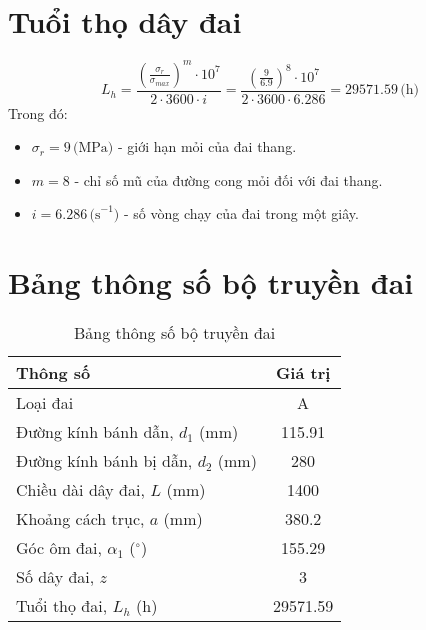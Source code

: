 \section{Tuổi thọ dây đai}
\begin{equation}
    L_h = \frac{\left(\frac{\sigma_r}{\sigma_{max}}\right)^m \cdot 10^7}{2 \cdot 3600 \cdot i} = \frac{\left(\frac{9}{6.9}\right)^8 \cdot 10^7}{2 \cdot 3600 \cdot 6.286} = 29571.59 \, \text{(h)}
\end{equation}
Trong đó:
\begin{itemize}
    \item $\sigma_r = 9 \, \text{(MPa)}$ - giới hạn mỏi của đai thang.
    \item $m = 8$ - chỉ số mũ của đường cong mỏi đối với đai thang.
    \item $i = 6.286 \, \text{(s}^{-1}\text{)}$ - số vòng chạy của đai trong một giây.
\end{itemize}
\section{Bảng thông số bộ truyền đai}
\begin{table}[H]
    \centering
    \begin{tabular}{|l|c|}
        \hline
        \textbf{Thông số} & \textbf{Giá trị} \\ \hline
        Loại đai & A \\ \hline
        Đường kính bánh dẫn, $d_1$ (mm) & 115.91 \\ \hline
        Đường kính bánh bị dẫn, $d_2$ (mm) & 280 \\ \hline
        Chiều dài dây đai, $L$ (mm) & 1400 \\ \hline
        Khoảng cách trục, $a$ (mm) & 380.2 \\ \hline
        Góc ôm đai, $\alpha_1$ ($^\circ$) & 155.29 \\ \hline
        Số dây đai, $z$ & 3 \\ \hline
        Tuổi thọ đai, $L_h$ (h) & 29571.59 \\ \hline
    \end{tabular}
    \caption{Bảng thông số bộ truyền đai}
\end{table}
\cleardoublepage